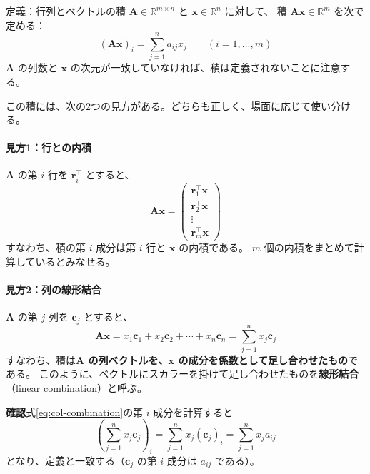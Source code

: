 \begin{itembox}[l]{定義：行列とベクトルの積}
$\bm{A} \in \mathbb{R}^{m \times n}$ と $\bm{x} \in \mathbb{R}^n$ に対して、
積 $\bm{A}\bm{x} \in \mathbb{R}^m$ を次で定める：
\begin{equation}
  (\bm{A}\bm{x})_i = \sum_{j=1}^{n} a_{ij} x_j \qquad (i = 1, \ldots, m)
\end{equation}
$\bm{A}$ の列数と $\bm{x}$ の次元が一致していなければ、積は定義されないことに注意する。
\end{itembox}

この積には、次の2つの見方がある。どちらも正しく、場面に応じて使い分ける。

\paragraph{見方1：行との内積}
$\bm{A}$ の第 $i$ 行を $\bm{r}_i^\top$ とすると、
\begin{equation}
  \bm{A}\bm{x} =
  \begin{pmatrix} \bm{r}_1^\top \bm{x} \\ \bm{r}_2^\top \bm{x} \\ \vdots \\ \bm{r}_m^\top \bm{x} \end{pmatrix}
\end{equation}
すなわち、積の第 $i$ 成分は第 $i$ 行と $\bm{x}$ の内積である。
$m$ 個の内積をまとめて計算しているとみなせる。

\paragraph{見方2：列の線形結合}
$\bm{A}$ の第 $j$ 列を $\bm{c}_j$ とすると、
\begin{equation}
  \bm{A}\bm{x} = x_1 \bm{c}_1 + x_2 \bm{c}_2 + \cdots + x_n \bm{c}_n = \sum_{j=1}^{n} x_j \bm{c}_j
  \label{eq:col-combination}
\end{equation}
すなわち、積は\textbf{$\bm{A}$ の列ベクトルを、$\bm{x}$ の成分を係数として足し合わせたもの}である。
このように、ベクトルにスカラーを掛けて足し合わせたものを\textbf{線形結合}（linear combination）と呼ぶ。

\noindent
\textbf{確認}\quad 式\eqref{eq:col-combination}の第 $i$ 成分を計算すると
\begin{equation}
  \left( \sum_{j=1}^{n} x_j \bm{c}_j \right)_i = \sum_{j=1}^{n} x_j (\bm{c}_j)_i = \sum_{j=1}^{n} x_j a_{ij}
\end{equation}
となり、定義と一致する（$\bm{c}_j$ の第 $i$ 成分は $a_{ij}$ である）。


